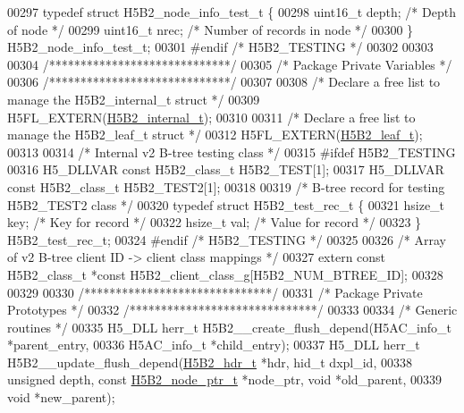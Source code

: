 \begin{DoxyCode}
{{00297 \textcolor{keyword}{typedef} \textcolor{keyword}{struct }H5B2\_node\_info\_test\_t \{
00298     uint16\_t depth;             \textcolor{comment}{/* Depth of node */}
00299     uint16\_t nrec;              \textcolor{comment}{/* Number of records in node */}
00300 \} H5B2\_node\_info\_test\_t;
00301 \textcolor{preprocessor}{#endif }\textcolor{comment}{/* H5B2\_TESTING */}\textcolor{preprocessor}{}
00302 
00303 
00304 \textcolor{comment}{/*****************************/}
00305 \textcolor{comment}{/* Package Private Variables */}
00306 \textcolor{comment}{/*****************************/}
00307 
00308 \textcolor{comment}{/* Declare a free list to manage the H5B2\_internal\_t struct */}
00309 H5FL\_EXTERN(\hyperlink{struct_h5_b2__internal__t}{H5B2\_internal\_t});
00310 
00311 \textcolor{comment}{/* Declare a free list to manage the H5B2\_leaf\_t struct */}
00312 H5FL\_EXTERN(\hyperlink{struct_h5_b2__leaf__t}{H5B2\_leaf\_t});
00313 
00314 \textcolor{comment}{/* Internal v2 B-tree testing class */}
00315 \textcolor{preprocessor}{#ifdef H5B2\_TESTING}
00316 H5\_DLLVAR \textcolor{keyword}{const} H5B2\_class\_t H5B2\_TEST[1];
00317 H5\_DLLVAR \textcolor{keyword}{const} H5B2\_class\_t H5B2\_TEST2[1];
00318 
00319 \textcolor{comment}{/* B-tree record for testing H5B2\_TEST2 class */}
00320 \textcolor{keyword}{typedef} \textcolor{keyword}{struct }H5B2\_test\_rec\_t \{
00321     hsize\_t key;        \textcolor{comment}{/* Key for record */}
00322     hsize\_t val;        \textcolor{comment}{/* Value for record */}
00323 \} H5B2\_test\_rec\_t;
00324 \textcolor{preprocessor}{#endif }\textcolor{comment}{/* H5B2\_TESTING */}\textcolor{preprocessor}{}
00325 
00326 \textcolor{comment}{/* Array of v2 B-tree client ID -> client class mappings */}
00327 \textcolor{keyword}{extern} \textcolor{keyword}{const} H5B2\_class\_t *\textcolor{keyword}{const} H5B2\_client\_class\_g[H5B2\_NUM\_BTREE\_ID];
00328 
00329 
00330 \textcolor{comment}{/******************************/}
00331 \textcolor{comment}{/* Package Private Prototypes */}
00332 \textcolor{comment}{/******************************/}
00333 
00334 \textcolor{comment}{/* Generic routines */}
00335 H5\_DLL herr\_t H5B2\_\_create\_flush\_depend(H5AC\_info\_t *parent\_entry,
00336     H5AC\_info\_t *child\_entry);
00337 H5\_DLL herr\_t H5B2\_\_update\_flush\_depend(\hyperlink{struct_h5_b2__hdr__t}{H5B2\_hdr\_t} *hdr, hid\_t dxpl\_id,
00338     \textcolor{keywordtype}{unsigned} depth, \textcolor{keyword}{const} \hyperlink{struct_h5_b2__node__ptr__t}{H5B2\_node\_ptr\_t} *node\_ptr, \textcolor{keywordtype}{void} *old\_parent,
00339     \textcolor{keywordtype}{void} *new\_parent);
}}
\end{DoxyCode}
